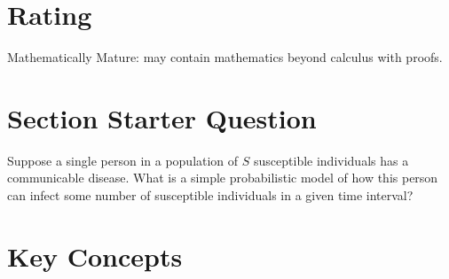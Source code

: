 \documentclass[12pt]{article}
\begin{document}
\myheader \mytitle

\hr


\hr

\section*{Rating} %
Mathematically Mature:  may contain mathematics beyond calculus with
proofs.  %

\hr

\section*{Section Starter Question}

Suppose a single person in a population of \( S \) susceptible
individuals has a communicable disease.  What is a simple probabilistic
model of how this person can infect some number of susceptible
individuals in a given time interval?

\hr

\section*{Key Concepts}
\end{document}
